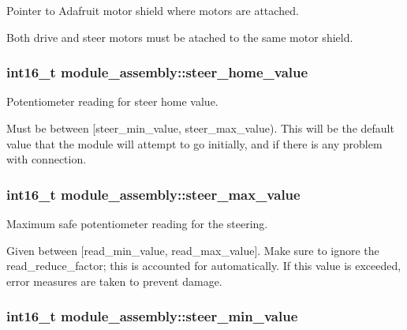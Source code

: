 Pointer to Adafruit motor shield where motors are attached. 

Both drive and steer motors must be atached to the same motor shield. \hypertarget{structmodule__assembly_a47838ac5150269f7889f38e62027fd23}{}
\subsubsection[{steer\+\_\+home\+\_\+value}]{\setlength{\rightskip}{0pt plus 5cm}int16\+\_\+t module\+\_\+assembly\+::steer\+\_\+home\+\_\+value}\label{structmodule__assembly_a47838ac5150269f7889f38e62027fd23}


Potentiometer reading for steer home value. 

Must be between \mbox{[}steer\+\_\+min\+\_\+value, steer\+\_\+max\+\_\+value). This will be the default value that the module will attempt to go initially, and if there is any problem with connection. \hypertarget{structmodule__assembly_a1d3511864da30dc6c827959b5204c5a3}{}
\subsubsection[{steer\+\_\+max\+\_\+value}]{\setlength{\rightskip}{0pt plus 5cm}int16\+\_\+t module\+\_\+assembly\+::steer\+\_\+max\+\_\+value}\label{structmodule__assembly_a1d3511864da30dc6c827959b5204c5a3}


Maximum safe potentiometer reading for the steering. 

Given between \mbox{[}read\+\_\+min\+\_\+value, read\+\_\+max\+\_\+value\mbox{]}. Make sure to ignore the read\+\_\+reduce\+\_\+factor; this is accounted for automatically. If this value is exceeded, error measures are taken to prevent damage. \hypertarget{structmodule__assembly_a55a1e597e4e373ac95a03a32a65a2048}{}
\subsubsection[{steer\+\_\+min\+\_\+value}]{\setlength{\rightskip}{0pt plus 5cm}int16\+\_\+t module\+\_\+assembly\+::steer\+\_\+min\+\_\+value}\label{structmodule__assembly_a55a1e597e4e373ac95a03a32a65a2048}


